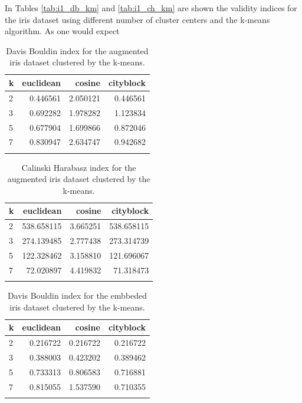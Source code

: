 \documentclass[conference]{IEEEtran}
\begin{document}
In Tables \ref{tab:i1_db_km} and \ref{tab:i1_ch_km} are shown the validity indices for the iris dataset using different number of cluster centers and the k-means algorithm. As one would expect 

\begin{table}[ht!]
    \centering
   \begin{tabular}{lrrr}
    \toprule
    k &  euclidean &    cosine &  cityblock \\
    \midrule
    2 &   0.446561 &  2.050121 &   0.446561 \\
    3 &   0.692282 &  1.978282 &   1.123834 \\
    5 &   0.677904 &  1.699866 &   0.872046 \\
    7 &   0.830947 &  2.634747 &   0.942682 \\
    \bottomrule \\
    \end{tabular}

    \caption{Davis Bouldin index for the augmented iris dataset clustered by the k-means.}
    \label{tab:i2_db_km}
\end{table}

\begin{table}[ht!]
    \centering
    \begin{tabular}{lrrr}
    \toprule
    k &   euclidean &    cosine &   cityblock \\
    \midrule
    2 &  538.658115 &  3.665251 &  538.658115 \\
    3 &  274.139485 &  2.777438 &  273.314739 \\
    5 &  122.328462 &  3.158810 &  121.696067 \\
    7 &   72.020897 &  4.419832 &   71.318473 \\
    \bottomrule\\
    \end{tabular}
    \caption{Calinski Harabasz index for the augmented iris dataset clustered by the k-means.}
    \label{tab:i2_ch_km}
\end{table}

\begin{table}[ht!]
    \centering
    \begin{tabular}{lrrr}
    \toprule
    k &  euclidean &    cosine &  cityblock \\
    \midrule
    2 &   0.216722 &  0.216722 &   0.216722 \\
    3 &   0.388003 &  0.423202 &   0.389462 \\
    5 &   0.733313 &  0.806583 &   0.716881 \\
    7 &   0.815055 &  1.537590 &   0.710355 \\
    \bottomrule \\
    \end{tabular}
    \caption{Davis Bouldin index for the embbeded iris dataset clustered by the k-means.}
    \label{tab:i2e_db_km}
\end{table}
\end{document}
